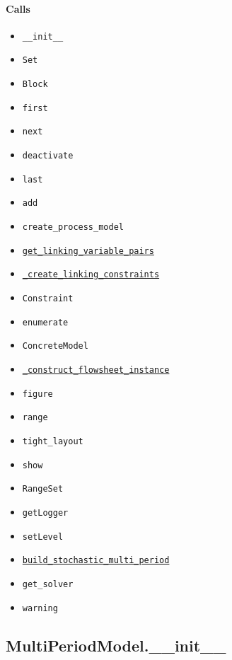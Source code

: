 \documentclass[11pt]{report}
\begin{document}
\paragraph{Calls}
\begin{itemize}[leftmargin=*]
  \item \texttt{\_\_init\_\_}
  \item \texttt{Set}
  \item \texttt{Block}
  \item \texttt{first}
  \item \texttt{next}
  \item \texttt{deactivate}
  \item \texttt{last}
  \item \texttt{add}
  \item \texttt{create\_process\_model}
  \item \hyperref[def:multiperiod-tests-test_multiperiod.py:get_linking_variable_pairs:L58]{\texttt{get\_linking\_variable\_pairs}}
  \item \hyperref[def:multiperiod-multiperiod.py:MultiPeriodModel._create_linking_constraints:L299]{\texttt{\_create\_linking\_constraints}}
  \item \texttt{Constraint}
  \item \texttt{enumerate}
  \item \texttt{ConcreteModel}
  \item \hyperref[def:multiperiod-multiperiod.py:MultiPeriodModel._construct_flowsheet_instance:L315]{\texttt{\_construct\_flowsheet\_instance}}
  \item \texttt{figure}
  \item \texttt{range}
  \item \texttt{tight\_layout}
  \item \texttt{show}
  \item \texttt{RangeSet}
  \item \texttt{getLogger}
  \item \texttt{setLevel}
  \item \hyperref[def:multiperiod-multiperiod.py:MultiPeriodModel.build_stochastic_multi_period:L351]{\texttt{build\_stochastic\_multi\_period}}
  \item \texttt{get\_solver}
  \item \texttt{warning}
\end{itemize}
\subsection{MultiPeriodModel.\_\_init\_\_}
\label{def:multiperiod-multiperiod.py:MultiPeriodModel.__init__:L53}
\end{document}
